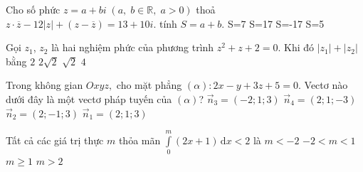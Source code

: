 \begin{ex}%
	Cho số phức $z=a+bi\; (a,\; b\in\mathbb{R},\; a>0)$ thoả $z\cdot \overline{z}-12|z|+(z-\overline{z})=13+10i$. tính $S=a+b$.
	\choice
	{S=7}
	{\True S=17}
	{S=-17}
	{S=5}
\end{ex}

\begin{ex}%
Gọi $z_1$, $z_2$ là hai nghiệm phức của phương trình $z^2+z+2=0$. Khi đó $\left| z_1\right|+\left| z_2\right|$ bằng
\choice
{$2$}
{\True $2\sqrt{2}$}
{$\sqrt{2}$}
{$4$}
\end{ex}

\begin{ex}%
Trong không gian $Oxyz,$ cho mặt phẳng $(\alpha)\colon 2x-y+3z+5=0$. Vectơ nào dưới đây là một vectơ pháp tuyến của $(\alpha)$?
\choice
{$\vec{n}_3=(-2;1;3)$}
{$\vec{n}_4=(2;1;-3)$}
{\True $\vec{n}_2=(2;-1;3)$}
{$\vec{n}_1=(2;1;3)$}
\end{ex}

\begin{ex}%
Tất cả các giá trị thực $m$ thỏa mãn $\displaystyle\int\limits_0^m{(2x+1)\mathrm{\,d}x<2}$ là
\choice
{$m<-2$}
{\True $-2<m<1$}
{$m\ge 1$}
{$m>2$}
\end{ex}

